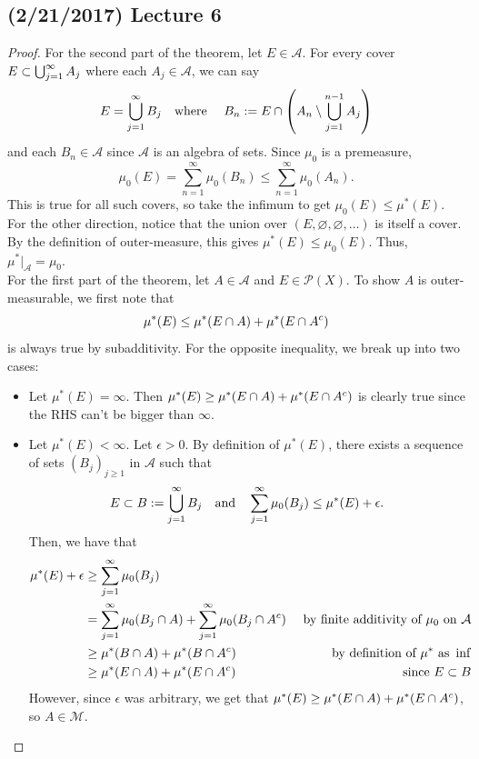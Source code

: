 \documentclass[11pt,leqno,oneside]{amsbook}
\numberwithin{thm}{section}
\renewcommand{\P}{\mathcal{P}}
\renewcommand{\A}{\mathcal{A}}
\newcommand{\M}{\mathcal{M}}
\renewcommand{\emptyset}{\varnothing}
\begin{document}
\subsection*{(2/21/2017) Lecture 6}
\begin{proof}
  For the second part of the theorem, let $E \in \A$.  For every cover $E \subset \bigcup_{j=1}^\infty A_j$ where each
  $A_j \in \A$, we can say \[
    E = \bigcup_{j=1}^\infty B_j \quad\text{where}\quad \ B_n := E \cap \left( A_n
      \setminus \bigcup_{j=1}^{n-1} A_j \right)
  \]
  and each $B_n \in \A$ since $\A$ is an algebra of sets. Since
  $\mu_0$ is a premeasure, \[
    \mu_0(E) = \sum_{n=1}^\infty \mu_0(B_n) \leq \sum_{n=1}^\infty \mu_0(A_n).
  \]
  This is true for all such covers, so take the infimum to get $\mu_0(E)
  \leq \mu^*(E)$. For the other direction, notice that the union over
  $(E, \emptyset, \emptyset, \ldots)$ is itself a cover.  By the definition of
  outer-measure, this gives $\mu^*(E) \leq \mu_0(E)$.  Thus, $\mu^*|_\A = \mu_0$. \\

  For the first part of the theorem, let $A \in \A$ and $E \in \P(X)$. To show $A$
  is outer-measurable, we first note that \[
      \mu^*(E) \leq \mu^*(E \cap A) + \mu^*(E \cap A^c)
   \]
   is always true by subadditivity.  For the opposite inequality, we break up into two cases:
  \begin{itemize}
  \item Let $\mu^*(E) = \infty$. Then $\mu^*(E) \geq \mu^*(E \cap A) + \mu^*(E \cap A^c)$ is clearly true since the RHS can't be bigger than $\infty$.
  \item Let $\mu^*(E) < \infty$. Let $\epsilon > 0$. By definition of
    $\mu^*(E)$, there exists a sequence of sets $(B_j)_{j \geq 1}$ in
    $\A$ such that \[
      E \subset B := \bigcup_{j=1}^\infty B_j \quad\text{and}\quad
      \sum_{j=1}^\infty \mu_0(B_j) \leq \mu^*(E) + \epsilon.
    \]
    Then, we have that
    \begin{align*}
      \mu^*(E) + \epsilon & \geq \sum_{j=1}^\infty \mu_0(B_j) \\
& = \sum_{j=1}^\infty \mu_0(B_j \intersect A) + \sum_{j=1}^\infty
  \mu_0(B_j \intersect A^c) & \text{ by finite additivity of }\mu_0
                              \text{ on }\A \\
& \geq \mu^*(B \intersect A) + \mu^*(B \intersect A^c) & \text { by
                                                         definition of
                                                         }\mu^* \text{
                                                         as } \inf \\
& \geq \mu^*(E \intersect A) + \mu^*(E \intersect A^c) & \text{ since
                                                         }E \subset B
    \end{align*}
    However, since $\epsilon$ was arbitrary, we get that $\mu^*(E)
    \geq \mu^*(E \cap A) + \mu^*(E \cap A^c)$, so $A \in
    \M$.
  \end{itemize}
\end{proof}
\end{document}
